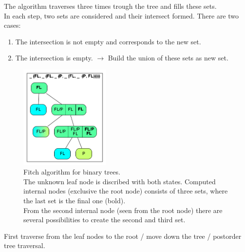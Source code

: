       The algorithm traverses three times trough the tree and fills these sets. \\
      In each step, two sets are considered and their intersect formed. There are two cases:
      \begin{enumerate}
        \item The intersection is not empty and corresponds to the new set.
        \item The intersection is empty. $\rightarrow$ Build the union of these sets as new set.
      \end{enumerate}
      \begin{figure}
        \centering
        \includegraphics[width=0.4\textwidth]{Figures/Fitch1.png}
        \caption{Fitch algorithm for binary trees. \\
          The unknown leaf node is discribed with both states. Computed internal nodes (exclusive the 
          root node) consists of three sets, where the last set is the final one (bold). \\
          From the second internal node (seen from the root node) there are several possibilities to 
          create the second and third set.}
        \label{fig: binary Fitch}
      \end{figure}
      First traverse from the leaf nodes to the root / move down the tree / postorder tree traversal.
      
